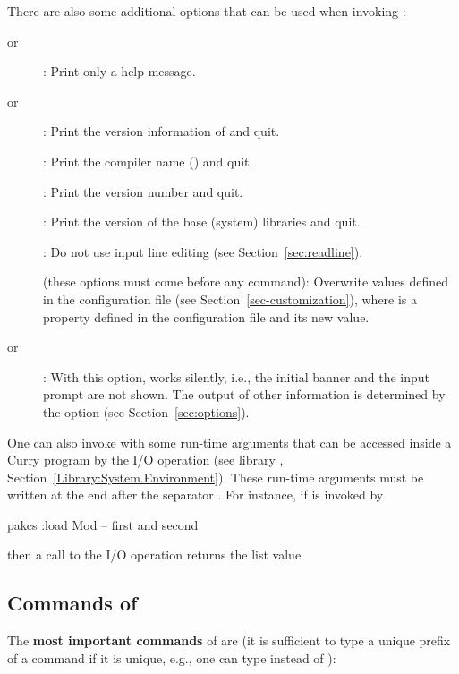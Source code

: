 There are also some additional options that can be used
when invoking \CYS:
\begin{description}
\item[ or ]:
Print only a help message.
\item[ or ]:
Print the version information of \CYS and quit.
\item[]:
Print the compiler name () and quit.
\item[]:
Print the version number and quit.
\item[]:
Print the version of the base (system) libraries and quit.
\item[]:
Do not use input line editing (see Section~\ref{sec:readline}).
\item[]
(these options must come before any \CYS command):
Overwrite values defined in the configuration file 
(see Section~\ref{sec-customization}),
where  is a property defined in the configuration file
and  its new value.
\item[ or ]:
With this option, \CYS works silently, i.e., the initial banner
and the input prompt are not shown.
The output of other information is determined by the option
 (see Section~\ref{sec:options}).
\end{description}
%
One can also invoke \CYS with some run-time arguments
that can be accessed inside a Curry program
by the I/O operation 
(see library ,
Section~\ref{Library:System.Environment}).
These run-time arguments must be written at the end after
the separator \ccode{--}.
For instance, if \CYS is invoked by
\begin{curry}
pakcs :load Mod -- first and second
\end{curry}
then a call to the I/O operation 
returns the list value
\begin{curry}
\end{curry}


\subsection{Commands of \CYS}
\label{sec:pakcs-commands}

The {\bf most important commands} of \CYS are
(it is sufficient to type a unique prefix of a command if it is unique,
e.g., one can type  instead of ):

